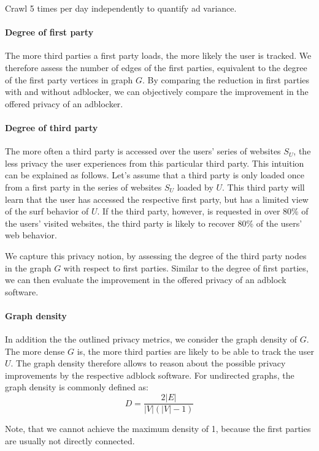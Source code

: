 \documentclass{sig-alternate}
\begin{document}
Crawl 5 times per day independently to quantify ad variance.

\paragraph{Degree of first party}
The more third parties a first party loads, the more likely the user is tracked. We therefore assess the number of edges of the first parties, equivalent to the degree of the first party vertices in graph $G$. By comparing the reduction in first parties with and without adblocker, we can objectively compare the improvement in the offered privacy of an adblocker.

\paragraph{Degree of third party}
The more often a third party is accessed over the users' series of websites $S_U$, the less privacy the user experiences from this particular third party. This intuition can be explained as follows. Let's assume that a third party is only loaded once from a first party in the series of websites $S_U$ loaded by $U$. This third party will learn that the user has accessed the respective first party, but has a limited view of the surf behavior of $U$. If the third party, however, is requested in over 80\% of the users' visited websites, the third party is likely to recover 80\% of the users' web behavior.

We capture this privacy notion, by assessing the degree of the third party nodes in the graph $G$ with respect to first parties.
Similar to the degree of first parties, we can then evaluate the improvement in the offered privacy of an adblock software.

\paragraph{Graph density}
In addition the the outlined privacy metrics, we consider the graph density of $G$. The more dense $G$ is, the more third parties are likely to be able to track the user $U$. The graph density therefore allows to reason about the possible privacy improvements by the respective adblock software. For undirected graphs, the graph density is commonly defined as:
\begin{equation}
D = \frac{2 |E|}{|V|(|V|-1)}
\end{equation}

Note, that we cannot achieve the maximum density of 1, because the first parties are usually not directly connected.
\end{document}
